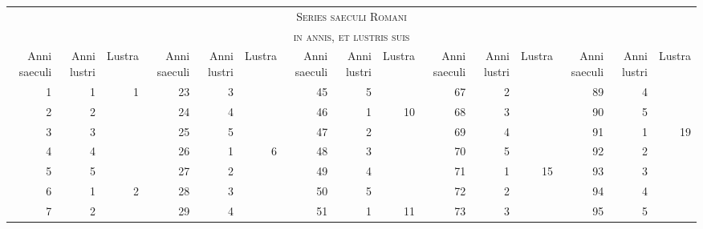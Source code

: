 %
\begin{tabnums} %
\normalsize
\centering
\setlength{\tabcolsep}{2.0pt}
\newcommand{\hts}{\tiny}
\newcommand{\cwd}{3em}
%
\newcommand{\da}{\scriptsize{†}}
\newcommand{\hdrA}{%
  \hts{\parbox[b]{\cwd}{\raggedright Anni saeculi}} &
  \hts{\parbox[b]{\cwd}{\raggedright Anni lustri}} &
  \hts{\parbox[b]{\cwd}{\raggedright Lustra}}
}
\begin{tabular}{@{} *{15}{r} @{}}
\toprule
\multicolumn{15}{c}{\Large\textsc{Series saeculi Romani}} \\
\multicolumn{15}{c}{\large\textsc{in annis, et lustris suis}} \\
\toprule
 \hdrA & \hdrA & \hdrA & \hdrA & \hdrA
\\
\cmidrule(r){1-3} \cmidrule(r){4-6} \cmidrule(r){7-9}
 \cmidrule(r){10-12} \cmidrule{13-15}
  1 & 1 & 1 & 23 & 3 & ~ & 45 & 5 &  ~ & 67 & 2 & ~ &  89 & 4 &  ~ \\
                           \cline{7-9}
  2 & 2 & ~ & 24 & 4 & ~ & 46 & 1 & 10 & 68 & 3 & ~ &  90 & 5 &  ~ \\
                                                       \cline{13-15}
  3 & 3 & ~ & 25 & 5 & ~ & 47 & 2 &  ~ & 69 & 4 & ~ &  91 & 1 & 19 \\
              \cline{4-6}
  4 & 4 & ~ & 26 & 1 & 6 & 48 & 3 &  ~ & 70 & 5 & ~ &  92 & 2 &  ~ \\
                                         \cline{10-12}
  5 & 5 & ~ & 27 & 2 & ~ & 49 & 4 &  ~ & 71 & 1 & 15 & 93 & 3 &  ~ \\
  \cline{1-3}
  6 & 1 & 2 & 28 & 3 & ~ & 50 & 5 &  ~ & 72 & 2 &  ~ &  94 & 4 &  ~ \\
                           \cline{7-9}
  7 & 2 & ~ & 29 & 4 & ~ & 51 & 1 & 11 & 73 & 3 &  ~ &  95 & 5 &  ~ \\
                                                       \cline{13-15}

\end{tabular}
\end{tabnums}
